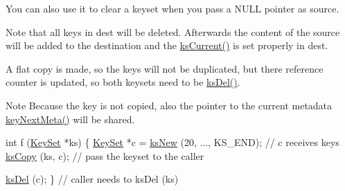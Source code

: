 You can also use it to clear a keyset when you pass a N\-U\-L\-L pointer as {\ttfamily source}.

Note that all keys in {\ttfamily dest} will be deleted. Afterwards the content of the source will be added to the destination and the \hyperlink{group__keyset_ga4287b9416912c5f2ab9c195cb74fb094}{ks\-Current()} is set properly in {\ttfamily dest}.

A flat copy is made, so the keys will not be duplicated, but there reference counter is updated, so both keysets need to be \hyperlink{group__keyset_ga27e5c16473b02a422238c8d970db7ac8}{ks\-Del()}.

\begin{DoxyNote}{Note}
Because the key is not copied, also the pointer to the current metadata \hyperlink{group__keymeta_ga4c88342f580a4291455a801af71ce048}{key\-Next\-Meta()} will be shared. 
\end{DoxyNote}



\begin{DoxyCode}
\textcolor{keywordtype}{int} f (\hyperlink{classkdb_1_1KeySet_a4eac9850fa4f06c07a5306befc3e4377}{KeySet} *ks)
\{
        \hyperlink{classkdb_1_1KeySet_a4eac9850fa4f06c07a5306befc3e4377}{KeySet} *c = \hyperlink{group__keyset_ga671e1aaee3ae9dc13b4834a4ddbd2c3c}{ksNew} (20, ..., KS\_END);
        \textcolor{comment}{// c receives keys}
        \hyperlink{group__keyset_gaba1f1dbea191f4d7e7eb3e4296ae7d5e}{ksCopy} (ks, c); \textcolor{comment}{// pass the keyset to the caller}

        \hyperlink{group__keyset_ga27e5c16473b02a422238c8d970db7ac8}{ksDel} (c);
\}       \textcolor{comment}{// caller needs to ksDel (ks)}
\end{DoxyCode}



